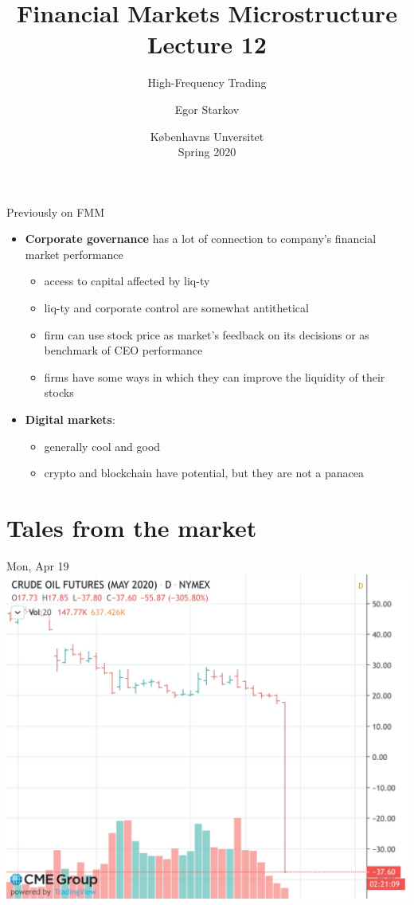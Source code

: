 \documentclass[english,10pt
,aspectratio=169
]{beamer}
\title{Financial Markets Microstructure \\ Lecture 12}
\subtitle{High-Frequency Trading}
\author{Egor Starkov}
\date{K{\o}benhavns Unversitet \\
	Spring 2020}
\begin{document}
	\frame[plain]{\titlepage}


\begin{frame}{Previously on FMM}
	\begin{itemize}
		\item \textbf{Corporate governance} has a lot of connection to company's financial market performance
		\begin{itemize}
			\item access to capital affected by liq-ty
			\item liq-ty and corporate control are somewhat antithetical
			\item firm can use stock price as market's feedback on its decisions or as benchmark of CEO performance
			\item firms have some ways in which they can improve the liquidity of their stocks
		\end{itemize}
		\item \textbf{Digital markets}:
		\begin{itemize}
			\item generally cool and good
			\item crypto and blockchain have potential, but they are not a panacea
		\end{itemize}
	\end{itemize}
\end{frame}


\section{Tales from the market}

\begin{frame}{Mon, Apr 19}
	\centering
	\includegraphics[scale=0.2]{pics/oil}
\end{frame}
\end{document}
